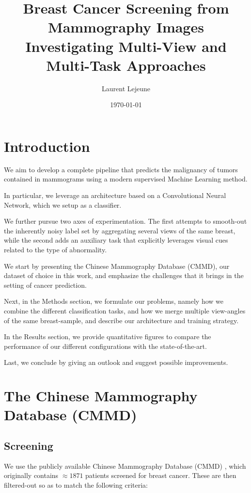 \documentclass[11pt]{article}
\author{Laurent Lejeune}
\date{\today}
\title{Breast Cancer Screening from Mammography Images\\\medskip
\large Investigating Multi-View and Multi-Task Approaches}
\begin{document}
\maketitle
\tableofcontents


\section{Introduction}
\label{sec:orgc84fcdb}

We aim to develop a complete pipeline that predicts the malignancy of tumors contained
in mammograms using a modern supervised Machine Learning method.

In particular, we leverage an architecture based on a Convolutional Neural Network,
which we setup as a classifier.

We further pursue two axes of experimentation. The first attempts to smooth-out the inherently
noisy label set by aggregating several views of the same breast, while the second
adds an auxiliary task that explicitly leverages visual cues related to the type of abnormality.

We start by presenting the Chinese Mammography Database (CMMD), our dataset of
choice in this work, and emphasize the challenges that it brings in the setting of cancer prediction.

Next, in the Methods section, we formulate our problems,
namely how we combine the different classification tasks, and how
we merge multiple view-angles of the same breast-sample,
and describe our architecture and training strategy.

In the Results section, we provide quantitative figures to compare the performance of our
different configurations with the state-of-the-art.

Last, we conclude by giving an outlook and suggest possible improvements.

\section{The Chinese Mammography Database (CMMD)}
\label{sec:orgf677314}

\subsection{\label{screening}Screening}
\label{sec:orgf0e00ca}

We use the publicly available Chinese Mammography Database (CMMD) \autocite{cai23},
which originally contains \(\approx 1871\) patients screened for breast cancer.
These are then filtered-out so as to match the following criteria:
\end{document}
